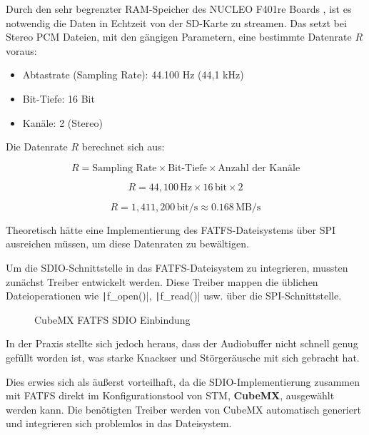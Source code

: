 Durch den sehr begrenzter RAM-Speicher des NUCLEO F401re Boards , ist es notwendig die Daten in Echtzeit von der SD-Karte zu streamen. Das setzt bei Stereo PCM Dateien, mit den gängigen Parametern, eine bestimmte Datenrate \( R \) voraus:

\begin{itemize}
	\item Abtastrate (Sampling Rate): 44.100 Hz (44,1 kHz)
	\item Bit-Tiefe: 16 Bit
	\item Kanäle: 2 (Stereo)
\end{itemize}

Die Datenrate \( R \) berechnet sich aus:

\[
R = \text{Sampling Rate} \times \text{Bit-Tiefe} \times \text{Anzahl der Kanäle}
\]



\[
R = 44{,}100 \, \text{Hz} \times 16 \, \text{bit} \times 2
\]

\[
R = 1{,}411{,}200 \, \text{bit/s} \approx 0.168 \, \text{MB/s}
\]


Theoretisch hätte eine Implementierung des FATFS-Dateisystems über SPI ausreichen müssen, um diese Datenraten zu bewältigen. 

Um die SDIO-Schnittstelle in das FATFS-Dateisystem zu integrieren, mussten zunächst Treiber entwickelt werden. Diese Treiber mappen die üblichen Dateioperationen wie \texttt|f_open()|, \texttt|f_read()| usw. über die SPI-Schnittstelle.

\begin{figure} %
	\caption{CubeMX FATFS SDIO Einbindung}
	\label{fig:cubemx_sdio}
\end{figure}

In der Praxis stellte sich jedoch heraus, dass der Audiobuffer nicht schnell genug gefüllt worden ist, was starke Knackser und Störgeräusche mit sich gebracht hat.

Dies erwies sich als äußerst vorteilhaft, da die SDIO-Implementierung zusammen mit FATFS direkt im Konfigurationstool von STM, \textbf{CubeMX}, ausgewählt werden kann. Die benötigten Treiber werden von CubeMX automatisch generiert und integrieren sich problemlos in das Dateisystem.

